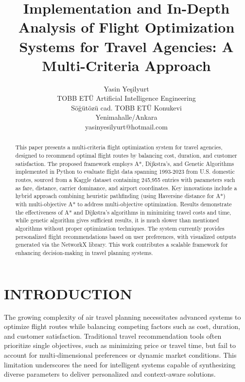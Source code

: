 \documentclass[conference]{IEEEtran}
\begin{document}
\title{Implementation and In-Depth Analysis of Flight Optimization Systems for Travel Agencies: A Multi-Criteria Approach}

\author{Yasin Yeşilyurt\\
TOBB ETÜ Artificial Intelligence
Engineering\\
Söğütözü cad. TOBB ETÜ Konukevi\\
Yenimahalle/Ankara\\
yasinyesilyurt@hotmail.com}

\maketitle

\begin{abstract}
This paper presents a multi-criteria flight optimization system for travel agencies, designed to recommend optimal flight routes by balancing cost, duration, and customer satisfaction. 
The proposed framework employs A*, Dijkstra's, and Genetic Algorithms implemented in Python to evaluate flight data spanning 1993-2023 from U.S. domestic routes, sourced from a Kaggle dataset containing 245,955 entries with parameters such as fare, distance, carrier dominance, and airport coordinates. 
Key innovations include a hybrid approach combining heuristic pathfinding (using Haversine distance for A*) with multi-objective A* to address multi-objective optimization. 
Results demonstrate the effectiveness of A* and Dijkstra's algorithms in minimizing travel costs and time, while genetic algorithm gives sufficient results, it is much slower than mentioned algorithms without proper optimization techniques. 
The system currently provides personalized flight recommendations based on user preferences, with visualized outputs generated via the NetworkX library.
This work contributes a scalable framework for enhancing decision-making in travel planning systems.
\end{abstract}

\section{INTRODUCTION}
The growing complexity of air travel planning necessitates advanced systems to optimize flight routes while balancing competing factors such as cost, duration, and customer satisfaction. 
Traditional travel recommendation tools often prioritize single objectives, such as minimizing price or travel time, but fail to account for multi-dimensional preferences or dynamic market conditions. 
This limitation underscores the need for intelligent systems capable of synthesizing diverse parameters to deliver personalized and context-aware solutions.\\
\end{document}
